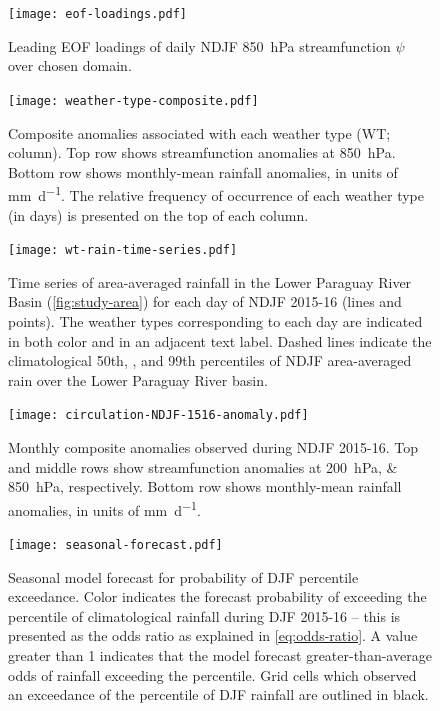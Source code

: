 \documentclass[twocol]{ametsoc}
\begin{document}
\begin{figure}
	\noindent\texttt{[image: eof-loadings.pdf]}
	\caption{
    	Leading EOF loadings of daily NDJF \SI{850}{\hecto\pascal} streamfunction $\psi$ over chosen domain.
	}
  \label{fig:eof-loading}
\end{figure}

\begin{figure}
	\noindent\texttt{[image: weather-type-composite.pdf]}
	\caption{
		Composite anomalies associated with each weather type (WT; column).
		Top row shows streamfunction anomalies at \SIlist{850}{\hecto\pascal}.
		Bottom row shows monthly-mean rainfall anomalies, in units of \si{\milli\meter\per\day}. The relative frequency of occurrence of each weather type (in days) is presented on the top of each column.
	}
	\label{fig:wt-composite}
\end{figure}


\begin{figure}
	\noindent\texttt{[image: wt-rain-time-series.pdf]}
	\caption{
		Time series of area-averaged rainfall in the Lower Paraguay River Basin (\cref{fig:study-area}) for each day of NDJF  2015-16 (lines and points).
        The weather types corresponding to each day are indicated in both color and in an adjacent text label.
		Dashed lines indicate the climatological 50th, , and 99th percentiles of NDJF area-averaged rain over the Lower Paraguay River basin.
	}
  \label{fig:rain-wt}
\end{figure}


\begin{figure}
	\noindent\texttt{[image: circulation-NDJF-1516-anomaly.pdf]}
	\caption{
    	Monthly composite anomalies observed during NDJF 2015-16.
    	Top and middle rows show streamfunction anomalies at \SIlist{200;850}{\hecto\pascal}, respectively.
      Bottom row shows monthly-mean rainfall anomalies, in units of \si{\milli\meter\per\day}.
	}
  \label{fig:anomalies}
\end{figure}

\begin{figure}
	\noindent\texttt{[image: seasonal-forecast.pdf]}
	\caption{
	Seasonal model forecast for probability of DJF  percentile exceedance.
	Color indicates the forecast probability of exceeding the  percentile of climatological rainfall during DJF 2015-16 -- this is presented as the odds ratio as explained in \cref{eq:odds-ratio}.
	A value greater than 1 indicates that the model forecast greater-than-average odds of rainfall exceeding the  percentile.
	Grid cells which observed an exceedance of the  percentile of DJF rainfall are outlined in black.
	}
  \label{fig:seas-prob-fcst}
\end{figure}
\end{document}

